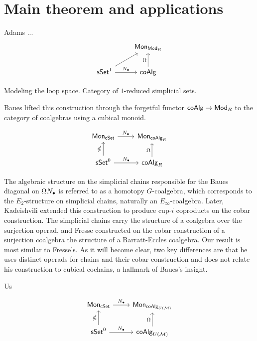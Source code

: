 
\section{Main theorem and applications}

Adams ...
\begin{equation*}
\begin{tikzcd}
& \Mon_{\Ch} \\
\sSet^1 \arrow[ru] \arrow[r, "\chains"] & \coAlg \arrow[u, "\cobar"]
\end{tikzcd}
\end{equation*}

Modeling the loop space. Category of $1$-reduced simplicial sets.

Baues lifted this construction through the forgetful functor $\mathsf{coAlg} \to \mathsf{Mod}_R$ to the category of coalgebras using a cubical monoid.

\begin{equation*}
\begin{tikzcd}
\Mon_{\cSet} \arrow[r, "\chains"] & \Mon_{\coAlg_R} \\
\sSet^0 \arrow[r, "\chains"] \arrow[u, "\gcobar"] & \coAlg_R \arrow[u, "\cobar"]
\end{tikzcd}
\end{equation*}

The algebraic structure on the simplicial chains responsible for the Baues diagonal on $\Omega N_\bullet$ is referred to as a homotopy $G$-coalgebra, which corresponds to the $E_2$-structure on simplicial chains, naturally an $E_\infty$-coalgebra.
Later, Kadeishvili \cite{Kadeishvili03cup-i} extended this construction to produce cup-$i$ coproducts on the cobar construction. 
The simplicial chains carry the structure of a coalgebra over the surjection operad, and Fresse \cite{Fresse03construction} constructed on the cobar construction of a surjection coalgebra the structure of a Barratt-Eccles coalgebra.
Our result is most similar to Fresse's.
As it will become clear, two key differences are that he uses distinct operads for chains and their cobar construction and does not relate his construction to cubical cochains, a hallmark of Baues's insight.




Us

\begin{equation*}
\begin{tikzcd}
\Mon_{\cSet} \arrow[r, "\chains"] & \Mon_{\coAlg_{U(\M)}} \\
\sSet^0 \arrow[r, "\chains"] \arrow[u, "\gcobar"] & \coAlg_{U(\M)} \arrow[u, "\cobar"]
\end{tikzcd}
\end{equation*}